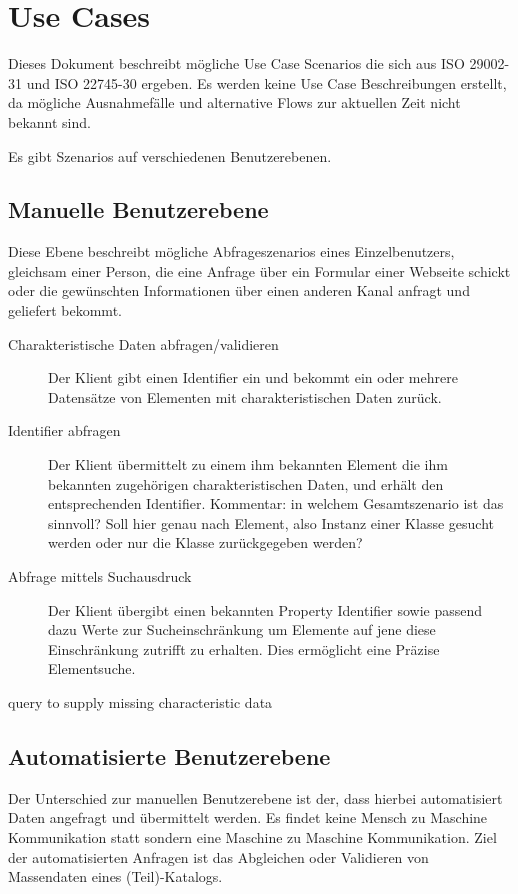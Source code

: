 \chapter{Use Cases}

Dieses Dokument beschreibt mögliche Use Case Scenarios die sich aus ISO 29002-31 und ISO 22745-30 ergeben. Es werden keine Use Case Beschreibungen erstellt, da mögliche Ausnahmefälle und alternative Flows zur aktuellen Zeit nicht bekannt sind. 

Es gibt Szenarios auf verschiedenen Benutzerebenen. 

\section{Manuelle Benutzerebene}
Diese Ebene beschreibt mögliche Abfrageszenarios eines Einzelbenutzers, gleichsam einer Person, die eine Anfrage über ein Formular einer Webseite schickt oder die gewünschten Informationen über einen anderen Kanal anfragt und geliefert bekommt. 

\begin{description}
\item[Charakteristische Daten abfragen/validieren] Der Klient gibt einen Identifier ein und bekommt ein oder mehrere Datensätze von Elementen mit charakteristischen Daten zurück. 
\item[Identifier abfragen] Der Klient übermittelt zu einem ihm bekannten Element die ihm bekannten zugehörigen charakteristischen Daten, und erhält den entsprechenden Identifier.
Kommentar: in welchem Gesamtszenario ist das sinnvoll? Soll hier genau nach Element, also Instanz einer Klasse gesucht werden oder nur die Klasse zurückgegeben werden?
\item[Abfrage mittels Suchausdruck] Der Klient übergibt einen bekannten Property Identifier sowie passend dazu Werte zur Sucheinschränkung um Elemente auf jene diese Einschränkung zutrifft zu erhalten. Dies ermöglicht eine Präzise Elementsuche. 
\item[query to supply missing characteristic data]
\end{description}

\section{Automatisierte Benutzerebene}
Der Unterschied zur manuellen Benutzerebene ist der, dass hierbei automatisiert Daten angefragt und übermittelt werden. Es findet keine Mensch zu Maschine Kommunikation statt sondern eine Maschine zu Maschine Kommunikation. 
Ziel der automatisierten Anfragen ist das Abgleichen oder Validieren von Massendaten eines (Teil)-Katalogs. 

